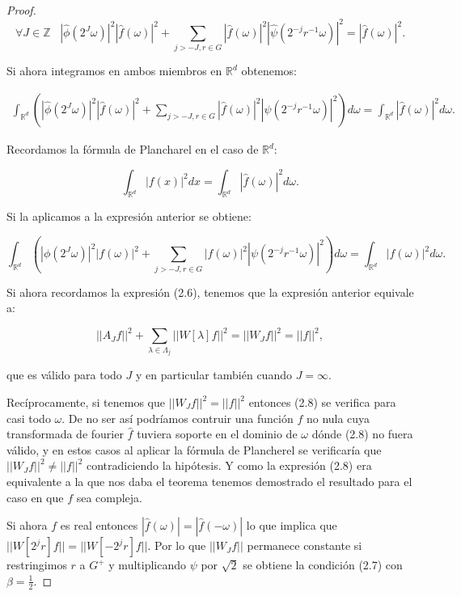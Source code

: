 \begin{proof}
$$\forall J \in \mathbb{Z} \; \; \; \left|\widehat{\phi}\left(2^J\omega\right)\right|^2 \left|\widehat{f}(\omega)\right|^2 + \sum_{j>-J,r\in G}\left|\widehat{f}(\omega)\right|^2\left|\widehat{\psi}\left(2^{-j}r^{-1}\omega\right)\right|^2=\left|\widehat{f}(\omega)\right|^2.$$

\noindent Si ahora integramos en ambos miembros en $\mathbb{R}^d$ obtenemos: 

     \begin{align*}
        \int_{\mathbb{R}^d}\left(\left|\widehat{\phi}\left(2^J\omega\right)\right|^2 \left|\widehat{f}(\omega)\right|^2 + \sum_{j>-J,r\in G}\left|\widehat{f}(\omega)\right|^2\left|\widehat{\psi}\left(2^{-j}r^{-1}\omega\right)\right|^2 \right) d\omega=\int_{\mathbb{R}^d}\left|\widehat{f}(\omega)\right|^2 d\omega.
    \end{align*}
    
\noindent Recordamos la fórmula de Plancharel en el caso de $\mathbb{R}^d$: 

$$\int_{\mathbb{R}^d} \left|f(x)\right|^2 dx= \int_{\mathbb{R}^d}\left|\widehat{f}(\omega)\right|^2 d\omega.$$

\noindent Si la aplicamos a la expresión anterior se obtiene:

$$\int_{\mathbb{R}^d}\left(\left|\phi\left(2^J\omega\right)\right|^2 \left|f(\omega)\right|^2 + \sum_{j>-J,r\in G}\left|f(\omega)\right|^2\left|\psi\left(2^{-j}r^{-1}\omega\right)\right|^2 \right) d\omega=\int_{\mathbb{R}^d}\left|f(\omega)\right|^2 d\omega.$$

\noindent Si ahora recordamos la expresión (2.6), tenemos que la expresión anterior equivale a:

$$||A_Jf||^2+\sum_{\lambda \in \Lambda_j} ||W[\lambda]f||^2=||W_J f||^2=||f||^2,$$

\noindent que es válido para todo $J$ y en particular también cuando $J=\infty$.

\medskip

\noindent Recíprocamente, si tenemos que $||W_J f||^2=||f||^2$ entonces (2.8) se verifica para casi todo $\omega$. De no ser así podríamos contruir una función $f$ no nula cuya transformada de fourier $\widehat{f}$ tuviera soporte en el dominio de $\omega$ dónde (2.8) no fuera válido, y en estos casos al aplicar la fórmula de Plancherel se verificaría que $||W_J f||^2 \neq ||f||^2$ contradiciendo la hipótesis. Y como la expresión (2.8) era equivalente a la que nos daba el teorema tenemos demostrado el resultado para el caso en que $f$ sea compleja. 

\medskip

\noindent Si ahora $f$ es real entonces $|\widehat{f}(\omega)|=|\widehat{f}(-\omega)|$ lo que implica que $||W[2^jr]f||=||W[-2^jr]f||$. Por lo que $||W_J f||$ permanece constante si restringimos $r$ a $G^+$ y multiplicando $\psi$ por $\sqrt{2}$ se obtiene la condición (2.7) con $\beta=\frac{1}{2}$. \qedhere

\end{proof}

